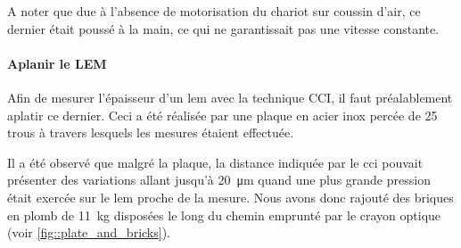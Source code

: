                    A noter que due à l'absence de motorisation du chariot sur coussin d'air, ce dernier était poussé à la main, ce qui ne garantissait pas une vitesse constante.
                    
                \paragraph{Aplanir le LEM}
                    
                    Afin de mesurer l'épaisseur d'un \gls{lem} avec la technique CCI, il faut préalablement aplatir ce dernier. Ceci a été réalisée par une plaque en acier inox percée de 25 trous à travers lesquels les mesures étaient effectuée. 
                    
                    
                    
                    
                    Il a été observé que malgré la plaque, la distance indiquée par le \gls{cci} pouvait présenter des variations allant jusqu'à \SI{20}{\micro\meter} quand une plus grande pression était exercée sur le \gls{lem} proche de la mesure. Nous avons donc rajouté des briques en plomb de \SI{11}{\kilo\gram} disposées le long du chemin emprunté par le crayon optique (voir \autoref{fig::plate_and_bricks}). %
                    

